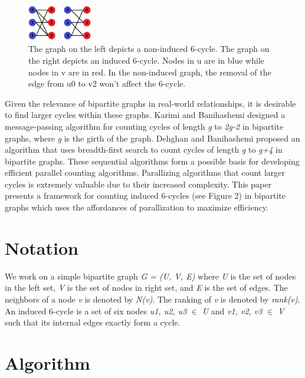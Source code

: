 \documentclass[11pt]{article}
\begin{document}
\begin{figure}[h]
    \centering
    \includegraphics[width=0.25\textwidth]{figures/Induced vs Noninduced.png}
    \caption{\small The graph on the left depicts a non-induced 6-cycle. The graph on the right depicts an induced 6-cycle. Nodes in u are in blue while nodes in v are in red. In the non-induced graph, the removal of the edge from u0 to v2 won't affect the 6-cycle.}
    \label{fig:induced}
\end{figure}

Given the relevance of bipartite graphs in real-world relationships, it is desirable to find larger cycles within these graphs.
Karimi and Banihashemi \cite{karimi2012message} designed a message-passing algorithm for counting cycles of length \textit{g} to \textit{2g-2} in bipartite graphs, where \textit{g} is the girth of the graph.
Dehghan and Banihashemi \cite{dehghan2019counting} proposed an algorithm that uses breadth-first search to count cycles of length \textit{g}  to \textit{g+4} in bipartite graphs.
These sequential algorithms form a possible basis for developing efficient parallel counting algorithms.
Parallizing algorithms that count larger cycles is extremely valuable due to their increased complexity.
This paper presents a framework for counting induced 6-cycles (see Figure 2) in bipartite graphs which uses the affordances of parallization to maximize efficiency.

\section{Notation}
We work on a simple bipartite graph \textit{G = (U, V, E)} where \textit{U} is the set of nodes in the left set, \textit{V} is the set of nodes in right set, and \textit{E} is the set of edges.
The neighbors of a node \textit{v} is denoted by \textit{N(v)}. The ranking of \textit{v} is denoted by \textit{rank(v)}.
An induced 6-cycle is a set of six nodes \textit{u1, u2, u3} $\in$ \textit{U} and \textit{v1, v2, v3} $\in$ \textit{V} such that its internal edges exactly form a cycle.

\section{Algorithm}
\end{document}
